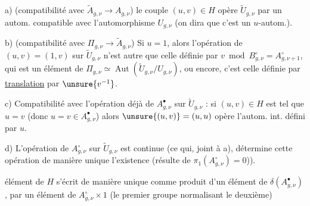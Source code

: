 
a)  (compatibilité avec \(\widetilde A_{g,\nu}\to A_{g,\nu}\)) le couple \((u,v)\in H\) opère  \(\widetilde U_{g,\nu}\) par un autom. compatible avec l'automorphisme  \(U_{g,\nu}\) (on dira que c'est un \(u\)-autom.).

b) (compatibilité avec \(\Pi_{g,\nu}\to\widetilde A_{g,\nu}\)) Si \(u=1\),  alors l'opération de \((u,v)=(1,v)\) sur \(\widetilde U_{g,\nu}\) n'est autre que celle définie par \(v\bmod B_{g,\nu}^{\circ}=A_{g,\nu+1}^{\circ}\), qui est un élément de \(\Pi_{g,\nu}\simeq\operatorname{Aut}(\widetilde U_{g,\nu}/U_{g,\nu})\), ou encore, c'est celle définie par \uline{translation}  par \(\unsure{v^{-1}}\).


c) Compatibilité avec  l'opération déjà   de \(A_{g,\nu}^{\bullet}\) sur \(\widetilde U_{g,\nu}\) : si \((u,v)\in H\) est tel que \(u=v\) (donc \(u=v\in A_{g,\nu}^{\bullet}\)) alors \(\unsure{(u,v)}=(u,u)\) opère  l'autom. int. défini par \(u\).


d)  L'opération de \(A_{g,\nu}^{\circ}\) sur \(\widetilde U_{g,\nu}\) est continue (ce qui, joint à a), détermine cette opération de manière unique   l'existence  (résulte de \(\pi_1(A_{g,\nu}^{\circ})=0\))).


 élément  de \(H\) s'écrit de manière unique comme produit d'un élément  de \(\delta(A_{g,\nu}^{\bullet})\), par un élément  de \(A_{g,\nu}^{\circ}\times 1\) (le premier groupe normalisant le deuxième)



